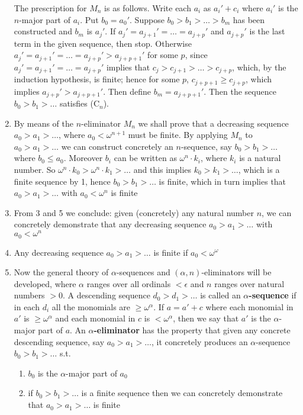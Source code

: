 \documentclass[11pt]{article}
\begin{document}
\begin{enumerate}
The prescription for \(M_n\) is as follows. Write each \(a_i\) as \(a_i'+c_i\) where \(a_i'\)
is the \(n\)-major part of \(a_i\). Put \(b_0=a_0'\). Suppose \(b_0>b_1>\dots>b_m\) has been
constructed and \(b_m\) is \(a_j'\). If \(a_j'=a_{j+1}'=\dots=a_{j+p}'\) and \(a_{j+p}'\) is the
last term in the given sequence, then stop.
Otherwise \(a_j'=a_{j+1}'=\dots=a_{j+p}'>a_{j+p+1}'\) for some \(p\),
since \(a_j'=a_{j+1}' =\dots=a_{j+p}'\) implies that \(c_j>c_{j+1}>\dots>c_{j+p}\), which, by
the induction hypothesis, is finite; hence for some \(p\), \(c_{j+p+1}\ge c_{j+p}\), which
implies \(a_{j+p}'>a_{j+p+1}'\). Then define \(b_m=a_{j+p+1}'\). Then the
sequence \(b_0>b_1>\dots\) satisfies (\(\text{C}_n\)).
\item By means of the \(n\)-eliminator \(M_n\) we shall prove that a decreasing
sequence \(a_0>a_1>\dots\), where \(a_0<\omega^{n+1}\) must be finite. By applying \(M_n\)
to \(a_0>a_1>\dots\) we can construct concretely an \(n\)-sequence, say \(b_0>b_1>\dots\)
where \(b_0\le a_0\). Moreover \(b_i\) can be written as \(\omega^n\cdot k_i\), where \(k_i\) is a
natural number. So \(\omega^n\cdot k_0>\omega^n\cdot k_1>\dots\) and this implies \(k_0>k_1>\dots\),
which is a finite sequence by 1, hence \(b_0>b_1>\dots\) is finite, which in turn implies
that \(a_0>a_1>\dots\) with \(a_0<\omega^n\) is finite
\item From 3 and 5 we conclude: given (concretely) any natural number \(n\), we can concretely
demonstrate that any decreasing sequence \(a_0>a_1>\dots\) with \(a_0<\omega^n\)
\item Any decreasing sequence \(a_0>a_1>\dots\) is finite if \(a_0<\omega^{\omega}\)
\item Now the general theory of \(\alpha\)-sequences and \((\alpha,n)\)-eliminators will be developed,
where \(\alpha\) ranges over all ordinals \(<\epsilon\) and \(n\) ranges over natural numbers \(>0\). A
descending sequence \(d_0>d_1>\dots\) is called an \textbf{\(\alpha\)-sequence} if in each \(d_i\) all
the monomials are \(\ge\omega^{\alpha}\). If \(a=a'+c\) where each monomial in \(a'\)
is \(\ge\omega^{\alpha}\) and each monomial in \(c\) is \(<\omega^{\alpha}\), then we say that \(a'\) is
the \(\alpha\)-major part of \(a\). An \textbf{\(\alpha\)-eliminator} has the property that given any
concrete descending sequence, say \(a_0>a_1>\dots\), it concretely produces
an \(\alpha\)-sequence
\(b_0>b_1>\dots\) s.t.
\begin{enumerate}
\item \(b_0\) is the \(\alpha\)-major part of \(a_0\)
\item if \(b_0>b_1>\dots\) is a finite sequence then we can concretely demonstrate
that \(a_0>a_1>\dots\) is finite


\end{enumerate}
\end{enumerate}
\end{document}
